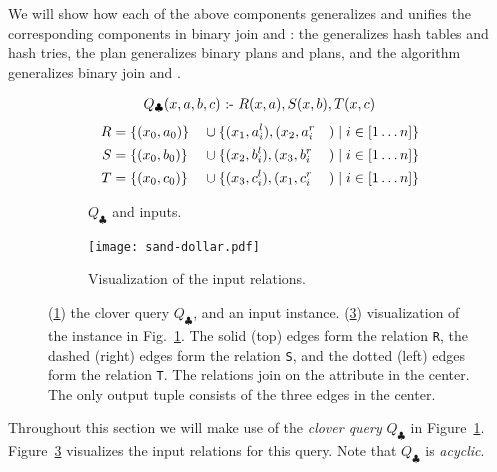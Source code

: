 We will show how each of the above components generalizes 
  and unifies the corresponding components in binary join 
  and \GJ: 
  the \GHT generalizes hash tables and hash tries,
  the \FJ plan generalizes binary plans and \GJ plans, and
  the \FJ algorithm generalizes binary join and \GJ.

\begin{figure}
\begin{subfigure}[b]{0.49\linewidth}
\begin{align*}
  Q_{\clubsuit}(x,a,b,c) \text{ :- } R(x,a),S(x,b),T(x,c)
\end{align*}
\begin{alignat*}{4}
  R & = \{(x_0, a_0)\} && \cup \{(x_1, a_i^l), (x_2, a_i^r &&) \mid i \in [1 \ldots n] \} \\
  S & = \{(x_0, b_0)\} && \cup \{(x_2, b_i^l), (x_3, b_i^r &&) \mid i \in [1 \ldots n] \} \\
  T & = \{(x_0, c_0)\} && \cup \{(x_3, c_i^l), (x_1, c_i^r &&) \mid i \in [1 \ldots n] \} 
\end{alignat*}
\caption{$Q_\clubsuit$ and inputs.}
\label{fig:clover-query}
\end{subfigure}
\begin{subfigure}[b]{0.5\linewidth}
  \centering
  \texttt{[image: sand-dollar.pdf]}
  \caption{Visualization of the input relations.}
  \label{fig:clover-vis}
\end{subfigure}
\caption{(\ref{fig:clover-query}) the clover query $Q_\clubsuit$, and an input instance.
(\ref{fig:clover-vis}) visualization of the instance in
    Fig.~\ref{fig:clover-query}. The solid (top) edges form the relation
    \texttt{R}, the dashed (right) edges form the relation \texttt{S},
    and the dotted (left) edges form the relation \texttt{T}.  The
    relations join on the attribute in the center.  The only output
    tuple consists of the three edges in the center. }
\end{figure}

Throughout this section we will make use of the {\em clover query}
$Q_\clubsuit$ in Figure~\ref{fig:clover-query}.
Figure~\ref{fig:clover-vis} visualizes the input relations for this query.
Note that $Q_\clubsuit$ is
\emph{acyclic}.

